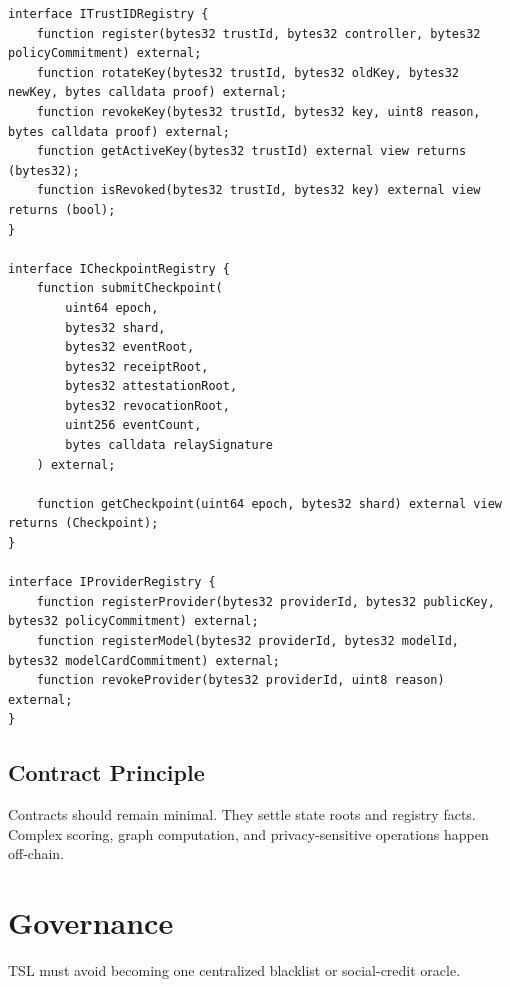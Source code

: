 \documentclass[11pt]{article}
\newcommand{\TSL}{\textsc{TSL}}
\begin{document}
\begin{lstlisting}[style=tslcode]
interface ITrustIDRegistry {
    function register(bytes32 trustId, bytes32 controller, bytes32 policyCommitment) external;
    function rotateKey(bytes32 trustId, bytes32 oldKey, bytes32 newKey, bytes calldata proof) external;
    function revokeKey(bytes32 trustId, bytes32 key, uint8 reason, bytes calldata proof) external;
    function getActiveKey(bytes32 trustId) external view returns (bytes32);
    function isRevoked(bytes32 trustId, bytes32 key) external view returns (bool);
}

interface ICheckpointRegistry {
    function submitCheckpoint(
        uint64 epoch,
        bytes32 shard,
        bytes32 eventRoot,
        bytes32 receiptRoot,
        bytes32 attestationRoot,
        bytes32 revocationRoot,
        uint256 eventCount,
        bytes calldata relaySignature
    ) external;

    function getCheckpoint(uint64 epoch, bytes32 shard) external view returns (Checkpoint);
}

interface IProviderRegistry {
    function registerProvider(bytes32 providerId, bytes32 publicKey, bytes32 policyCommitment) external;
    function registerModel(bytes32 providerId, bytes32 modelId, bytes32 modelCardCommitment) external;
    function revokeProvider(bytes32 providerId, uint8 reason) external;
}
\end{lstlisting}

\subsection{Contract Principle}

Contracts should remain minimal. They settle state roots and registry facts. Complex scoring, graph computation, and privacy-sensitive operations happen off-chain.

\section{Governance}

\TSL{} must avoid becoming one centralized blacklist or social-credit oracle.
\end{document}
